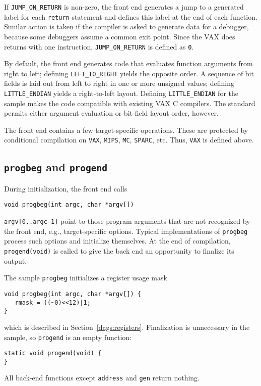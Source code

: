If \verb|JUMP_ON_RETURN| is non-zero, the front end generates a jump to
a generated label for each \verb|return| statement and defines this
label at the end of each function.  Similar action is taken if the
compiler is asked to generate data for a debugger, because some
debuggers assume a common exit point.  Since the VAX does returns with
one instruction, \verb|JUMP_ON_RETURN| is defined as \verb|0|.

By default, the front end generates code that evaluates function
arguments from right to left;
defining \verb|LEFT_TO_RIGHT| yields the opposite order.
A sequence of bit fields is laid out from left to right
in one or more unsigned values; defining \verb|LITTLE_ENDIAN|
yields a right-to-left layout.
Defining \verb|LITTLE_ENDIAN| for the sample
makes the code compatible with existing VAX C compilers.
The standard permits either argument evaluation
or bit-field layout order, however.

The front end contains a few target-specific operations.
These are protected by conditional compilation on \verb|VAX|,
\verb|MIPS|, \verb|MC|, \verb|SPARC|, etc. Thus, \verb|VAX| is defined above.

\subsection{{\tt progbeg} and \tt progend}

\label{progbeg}\label{progend}
During initialization, the front end calls
\begin{verbatim}
void progbeg(int argc, char *argv[])
\end{verbatim}
\verb|argv[0..argc-1]| point
to those program arguments that are not recognized by the front end,
e.g., target-specific options.
Typical implementations of \verb|progbeg| process such
options and initialize themselves.
At the end of compilation, \verb|progend(void)| is called to give
the back end an opportunity to finalize its output.

The sample \verb|progbeg| initializes a register usage mask
\begin{verbatim}
void progbeg(int argc, char *argv[]) {
   rmask = ((~0)<<12)|1;
}
\end{verbatim}
which is described in Section~\ref{dags:registers}.
Finalization is unnecessary in the sample,
so \verb|progend| is an empty function:
\begin{verbatim}
static void progend(void) {
}
\end{verbatim}
All back-end functions except \verb|address| and \verb|gen| return nothing.



